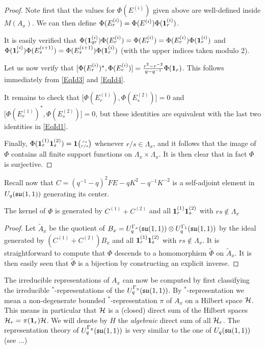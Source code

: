 \begin{proof} Note first that the values for $\Phi(E^{(i)})$ given above are well-defined inside $M(A_x)$. We can then define $\Phi(E^{(i)}_r) = \Phi(E^{(i)})\Phi(\mathbf{1}_r^{(i)})$. 

It is  easily verified that $\Phi(\mathbf{1}_{qr}^{(i)})\Phi(E^{(i)}_r) = \Phi(E^{(i)}_r) = \Phi(E^{(i)}_r)\Phi(\mathbf{1}_r^{(i)})$ and $\Phi(\mathbf{1}_r^{(i)})\Phi(E^{(i+1)}_s) = \Phi(E^{(i+1)}_s)\Phi(\mathbf{1}_r^{(i)})$ (with the upper indices taken modulo 2).

Let us now verify that $\lbrack \Phi(E^{(i)}_r)^*,\Phi(E^{(i)}_r)\rbrack = \frac{r^2-r^{-2}}{q-q^{-1}}\Phi(\mathbf{1}_r)$. This follows immediately from \eqref{EqId3} and \eqref{EqId4}.

It remains to check that $\lbrack \Phi(E^{(1)}_r),\Phi(E^{(2)}_s)\rbrack = 0$ and $\lbrack \Phi(E^{(1)}_r)^*,\Phi(E^{(2)}_s)\rbrack = 0$, but these identities are equivalent with the last two identities in \eqref{EqId1}.

Finally, $\Phi(\mathbf{1}_r^{(1)}\mathbf{1}_s^{(2)}) = \mathbf{1}{\tiny {\begin{pmatrix} rs\\r/s\end{pmatrix}}}$ whenever $r/s\in \Lambda_x$, and it follows that the image of $\Phi$ contains all finite support functions on $\Lambda_x\times \Lambda_x$. It is then clear that in fact $\Phi$ is surjective. 
\end{proof}

Recall now that $C = (q^{-1}-q)^2FE-qK^2-q^{-1}K^{-2}$ is a self-adjoint element in $U_q(\mathfrak{su}(1,1))$ generating its center. 

\begin{Lem} The kernel of $\Phi$ is generated by $C^{(1)}+C^{(2)}$ and all $\mathbf{1}_r^{(1)}\mathbf{1}_s^{(2)}$ with $rs\notin \Lambda_x$
\end{Lem} 
\begin{proof} Let $\widetilde{A}_x$ be the quotient of $B_x = U_q^{\Gamma_x}(\mathfrak{su}(1,1))\otimes U_q^{\Gamma_1}(\mathfrak{su}(1,1))$ by the ideal generated by $(C^{(1)}+C^{(2)})B_x$ and all $\mathbf{1}_r^{(1)}\mathbf{1}_s^{(2)}$ with $rs\notin \Lambda_x$. It is straightforward to compute that $\Phi$ descends to a homomorphism $\widetilde{\Phi}$ on $\widetilde{A}_x$. It is then easily seen that $\widetilde{\Phi}$ is a bijection by constructing an explicit inverse.
\end{proof}

The irreducible representations of $A_x$ can now be computed by first classifying the irreducible $^*$-representations of the $U_q^{\Gamma_y}(\mathfrak{su}(1,1))$. By $^*$-representation we mean a non-degenerate bounded $^*$-representation $\pi$ of $A_x$ on a Hilbert space $\mathcal{H}$. This means in particular that $\mathcal{H}$ is a (closed) direct sum of the Hilbert spaces $\mathcal{H}_r = \pi(\mathbf{1}_r)\mathcal{H}$. We will denote by $H$ the \emph{algebraic} direct sum of all $\mathcal{H}_r$. The representation theory of $U_q^{\Gamma_y}(\mathfrak{su}(1,1))$ is very similar to the one of $U_q(\mathfrak{su}(1,1))$ (see ...)

